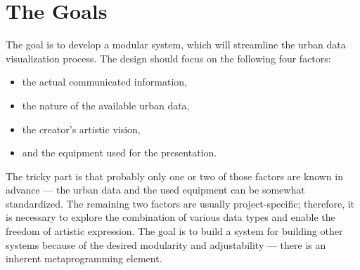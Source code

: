 \section{The Goals}
The goal is to develop a modular system, which will streamline the urban data visualization process. The design should focus on the following four factors:
\begin{itemize}
    \item the actual communicated information,
    \item the nature of the available urban data,
    \item the creator's artistic vision,
    \item and the equipment used for the presentation.
\end{itemize}
The tricky part is that probably only one or two of those factors are known in advance --- the urban data and the used equipment can be somewhat standardized. The remaining two factors are usually project-specific; therefore, it is necessary to explore the combination of various data types and enable the freedom of artistic expression. The goal is to build a system for building other systems because of the desired modularity and adjustability --- there is an inherent metaprogramming element.
